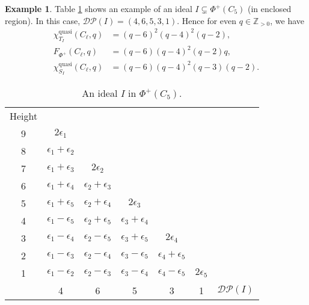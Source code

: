 \documentclass[12pt]{amsart}
\theoremstyle{plain}
\theoremstyle{definition}
\newtheorem{example}[theorem]{Example}
\theoremstyle{remark}
\newcommand{\Z}{\mathbb{Z}}
\newcommand{\quasi}{\operatorname{quasi}}
\newcommand{\DP}{{\mathcal{DP}}}
\begin{document}
\begin{example}\label{eg:C-ideal}   
 Table \ref{tab:C5-ideal} shows an example of an ideal $I\subsetneq  \Phi^+(C_5)$ (in enclosed region). 
 In this case, $\DP(I)=(4,6,5,3,1)$. Hence for even $q \in \Z_{>0}$, we have
\begin{align*}
\chi^{\quasi}_{T_{I}}(C_\ell, q) & =(q-6)^2(q-4)^2(q-2),\\ 
F_{\Phi^+}(C_\ell, q) &= (q-6)(q-4)^2(q-2)q,\\ 
\chi^{\quasi}_{S_{I}}(C_\ell, q) & = (q-6)(q-4)^2(q-3)(q-2).
\end{align*}
\end{example}


\begin{table}[htbp]
\centering
{\footnotesize\renewcommand{} 
\begin{tabular}{ccccccc}
\mbox{Height} & & & && \\
9 &  $2\epsilon_1$ &   &  & && \\
8 & $\epsilon_1+\epsilon_2$ &   & & &&\\
7 &$\epsilon_1+\epsilon_3$ & $2\epsilon_2$  & && \\
\cline{3-3}
6 & $\epsilon_1+\epsilon_4$ & \multicolumn{1}{|c|}{$\epsilon_2+\epsilon_3$}  & && \\
 \cline{4-4}
5 &$\epsilon_1+\epsilon_5$ & \multicolumn{1}{|c}{$\epsilon_2+\epsilon_4$} &\multicolumn{1}{c|}{$2\epsilon_3$} &&& \\
\cline{2-2}
4& \multicolumn{1}{|c}{$\epsilon_1-\epsilon_5$} & $\epsilon_2+\epsilon_5$& \multicolumn{1}{c|}{$\epsilon_3 +\epsilon_4$} &&&\\
\cline{5-5}
3 & \multicolumn{1}{|c}{$\epsilon_1-\epsilon_4$} & $\epsilon_2-\epsilon_5$ &$\epsilon_3 +\epsilon_5$ &  \multicolumn{1}{c|}{$2\epsilon_4$} &&\\
2& \multicolumn{1}{|c}{$\epsilon_1-\epsilon_3$} & $\epsilon_2-\epsilon_4$ & $\epsilon_3-\epsilon_5$ &\multicolumn{1}{c|}{$\epsilon_4+\epsilon_5$}&&\\
\cline{6-6}
1 & \multicolumn{1}{|c}{$\epsilon_1-\epsilon_2$} & $\epsilon_2 -\epsilon_3$& $\epsilon_3-\epsilon_4$  &  $\epsilon_4-\epsilon_5$ & \multicolumn{1}{c|}{$2\epsilon_5$}  &\\
\cline{2-6}
& 4 & 6 & 5 & 3  & 1 & $\DP(I)$
\end{tabular}
}
\bigskip
\caption{An ideal $I$ in $\Phi^+(C_5)$.}
\label{tab:C5-ideal}
\end{table}
\end{document}
